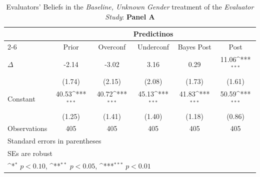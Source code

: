 \begin{table}[htbp]\centering
\def\sym#1{\ifmmode^{#1}\else\(^{#1}\)\fi}
\caption{Evaluators' Beliefs in the \textit{Baseline, Unknown Gender} treatment of the \textit{Evaluator Study}: \textbf{Panel A}}
\begin{tabular}{l*{5}{c}}
\hline\hline
                &\multicolumn{5}{c}{Predictinos}                                                               \\\cmidrule(lr){2-6}
                &\multicolumn{1}{c}{Prior}&\multicolumn{1}{c}{Overconf}&\multicolumn{1}{c}{Underconf}&\multicolumn{1}{c}{Bayes Post}&\multicolumn{1}{c}{Post}\\
\hline
$\Delta$        &    -2.14         &    -3.02         &     3.16         &     0.29         &    11.06\sym{***}\\
                &   (1.74)         &   (2.15)         &   (2.08)         &   (1.73)         &   (1.61)         \\
Constant        &    40.53\sym{***}&    40.72\sym{***}&    45.13\sym{***}&    41.83\sym{***}&    50.59\sym{***}\\
                &   (1.25)         &   (1.41)         &   (1.40)         &   (1.18)         &   (0.86)         \\
\hline
Observations    &      405         &      405         &      405         &      405         &      405         \\
\hline\hline
\multicolumn{6}{l}{\footnotesize Standard errors in parentheses}\\
\multicolumn{6}{l}{\footnotesize SEs are robust}\\
\multicolumn{6}{l}{\footnotesize \sym{*} \(p<0.10\), \sym{**} \(p<0.05\), \sym{***} \(p<0.01\)}\\
\end{tabular}
\end{table}
